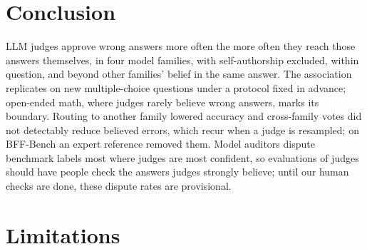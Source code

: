 \documentclass[11pt]{article}
\begin{document}
\section{Conclusion}

LLM judges approve wrong answers more often the more often they reach those answers themselves, in four model
families, with self-authorship excluded, within question, and beyond other families' belief in the same answer. The
association replicates on new multiple-choice questions under a protocol fixed in advance; open-ended math, where
judges rarely believe wrong answers, marks its boundary. Routing to another family lowered accuracy and cross-family votes did not detectably reduce
believed errors, which recur when a judge is resampled; on BFF-Bench an expert reference removed them. Model auditors dispute benchmark labels most where judges are most confident, so evaluations of
judges should have people check the answers judges strongly believe; until our human checks are done, these
dispute rates are provisional.

\section*{Limitations}
\end{document}
